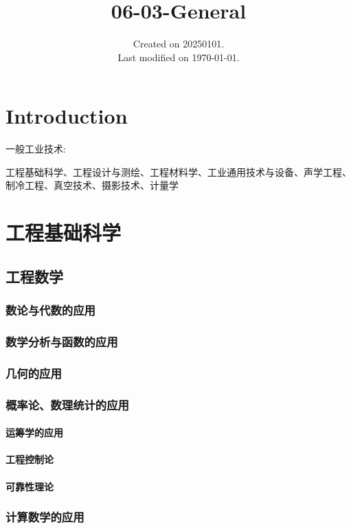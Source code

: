 \documentclass[UTF8]{../../ApplicationUniverse}
\begin{document}
\title{06-03-General}
\date{Created on 20250101.\\   Last modified on \today.}
\maketitle
\tableofcontents


\chapter{Introduction}

一般工业技术:

工程基础科学、工程设计与测绘、工程材料学、工业通用技术与设备、声学工程、制冷工程、真空技术、摄影技术、计量学



\chapter{工程基础科学}
\section{工程数学}
    \subsection{数论与代数的应用}
    \subsection{数学分析与函数的应用}
    \subsection{几何的应用}
    \subsection{概率论、数理统计的应用}
        \subsubsection{运筹学的应用}
        \subsubsection{工程控制论}
        \subsubsection{可靠性理论}
    \subsection{计算数学的应用}
\end{document}

